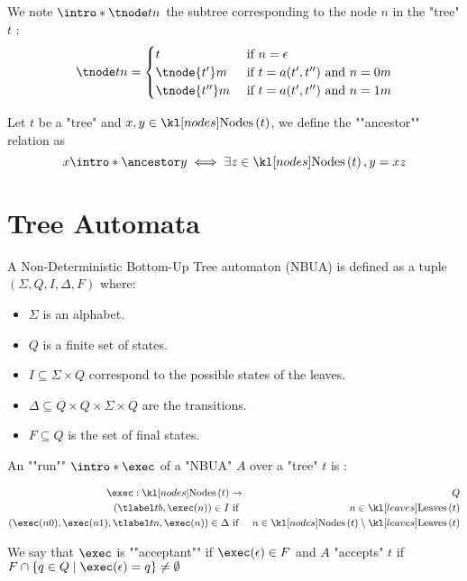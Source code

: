 \documentclass{article}
\begin{document}
\begin{definition}
	We note $\intro* \tnode t n$ the subtree corresponding to the node $n$ in the "tree" $t$ :
	\[
		\tnode t n =   \begin{cases}
			t              & \text{ if }  n = \epsilon                     \\
			\tnode {t'} m  & \text{ if } t = a(t',t'') \text{ and } n = 0m \\
			\tnode {t''} m & \text{ if } t = a(t',t'') \text{ and } n = 1m
		\end{cases}
	\]
\end{definition}

\begin{definition}
	Let $t$ be a "tree" and $x, y \in \nodes t$, we define the ""ancestor"" relation as
	\[  x \intro* \ancestor y \iff \exists z \in \nodes t, y = xz \]
\end{definition}



\section{Tree Automata}

\begin{definition}
	A Non-Deterministic Bottom-Up Tree automaton (NBUA) is defined as a tuple
	$(\Sigma, Q, I, \Delta, F)$ where:
	\begin{itemize}
		\item $\Sigma$ is an alphabet.
		\item $Q$ is a finite set of states.
		\item $I \subseteq \Sigma \times Q$ correspond to the possible states of the leaves.
		\item $\Delta \subseteq Q \times Q \times \Sigma \times Q$ are the transitions.
		\item $F \subseteq Q$ is the set of final states.
	\end{itemize}
\end{definition}

\begin{definition}
	An ""run"" $\intro* \exec$ of a "NBUA" $A$ over a "tree" $t$ is :

	\begin{eqnarray*}
		\exec : \nodes t &\to& Q \\
		(\tlabel t b,  \exec (n) ) \in I &\text{ if }& n \in \leaves t \\
		(\exec (n0), \exec (n1), \tlabel t n, \exec (n)) \in \Delta &\text{ if }& n \in \nodes t \setminus \leaves t
	\end{eqnarray*}

	We say that $\exec$ is ""acceptant"" if $\exec (\epsilon) \in F$ and $A$ "accepts" $t$ if
	$F \cap \setdef { q\in Q} {\exec (\epsilon) = q} \neq \emptyset$
\end{definition}
\end{document}
